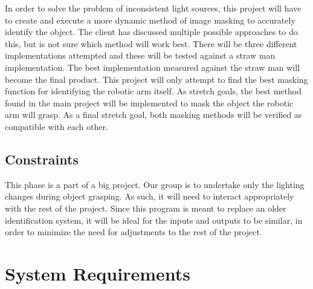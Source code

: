 \documentclass[10pt,journal,compsoc, draftclsnofoot,onecolumn]{IEEEtran}
\begin{document}
In order to solve the problem of inconsistent light sources, this project will have to create and execute a more dynamic method of image masking to accurately identify the object.
The client has discussed multiple possible approaches to do this, but is not sure which method will work best.
There will be three different implementations attempted and these will be tested against a straw man implementation.
The best implementation measured against the straw man will become the final product.
This project will only attempt to find the best masking function for identifying the robotic arm itself.
As stretch goals, the best method found in the main project will be implemented to mask the object the robotic arm will grasp.
As a final stretch goal, both masking methods will be verified as compatible with each other.




\subsection{Constraints}
This phase is a part of a big project.
Our group is to undertake only the lighting changes during object grasping.
As such, it will need to interact appropriately with the rest of the project.
Since this program is meant to replace an older identification system, it will be ideal for the inputs and outputs to be similar, in order to minimize the need for adjustments to the rest of the project.


\section{System Requirements}
\end{document}
